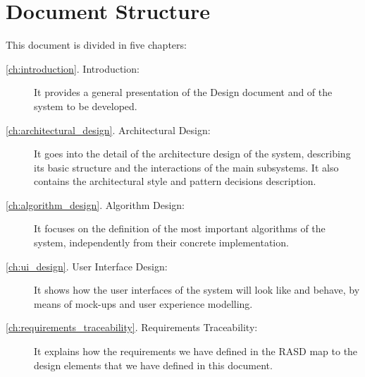 \section{Document Structure}
This document is divided in five chapters:

\begin{description}

	\item [\autoref{ch:introduction}. Introduction:] It provides a general presentation of the Design document and of the system to be developed.

	\item [\autoref{ch:architectural_design}. Architectural Design:]
	It goes into the detail of the architecture design of the system, describing its basic structure and the interactions of the main subsystems.
	It also contains the architectural style and pattern decisions description.

	\item [\autoref{ch:algorithm_design}. Algorithm Design:] It focuses on the definition of the
most important algorithms of the system, independently from their concrete implementation.

	\item [\autoref{ch:ui_design}. User Interface Design:] It shows how the user interfaces of the system will look like and behave, by means of mock-ups and user experience modelling.
	
	\item [\autoref{ch:requirements_traceability}. Requirements Traceability:] It explains how the requirements we have defined in the RASD map to the design elements that we have defined in this document. 

\end{description}